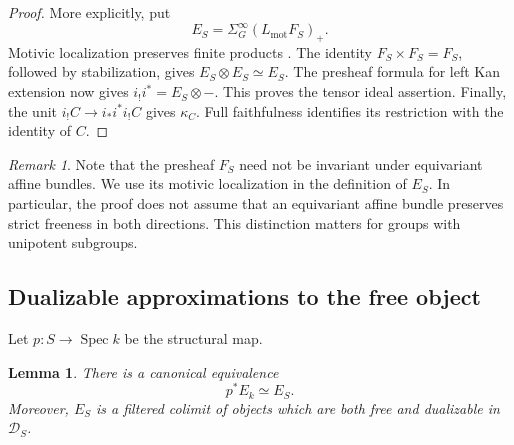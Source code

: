\documentclass[11pt,reqno]{amsart}
\newtheorem{lemma}[theorem]{Lemma}
\theoremstyle{definition}
\theoremstyle{remark}
\newtheorem{remark}[theorem]{Remark}
\theoremstyle{plain}
\numberwithin{equation}{section}
\begin{document}
\begin{proof}
More explicitly, put
\[
 E_S=\Sigma^\infty_G(L_{\mathrm{mot}}F_S)_+.
\]
Motivic localization preserves finite products
\cite[Proposition 3.15]{Hoyois}.
The identity \(F_S\times F_S=F_S\), followed by stabilization, gives
\(E_S\otimes E_S\simeq E_S\).
The presheaf formula for left Kan extension now gives
\(i_!i^*=E_S\otimes-\).
This proves the tensor ideal assertion.
Finally, the unit \(i_!C\to i_*i^*i_!C\) gives \(\kappa_C\).
Full faithfulness identifies its restriction with the identity of \(C\).
\end{proof}

\begin{remark}
Note that the presheaf \(F_S\) need not be invariant under equivariant affine
bundles. We use its motivic localization in the definition of \(E_S\).
In particular, the proof does not assume that an equivariant affine
bundle preserves strict freeness in both directions.
This distinction matters for groups with unipotent subgroups.
\end{remark}

\subsection{Dualizable approximations to the free object}

Let \(p:S\to\operatorname{Spec}k\) be the structural map.

\begin{lemma}\label{lem:free-pullback}
There is a canonical equivalence
\[
 p^*E_k\simeq E_S.
\]
Moreover, \(E_S\) is a filtered colimit of objects which are both free
and dualizable in \(\mathcal D_S\).
\end{lemma}
\end{document}
